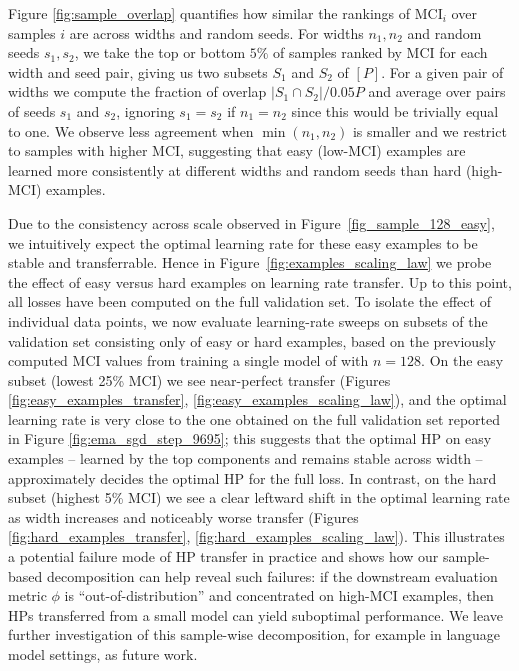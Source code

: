 \documentclass{article} %
\newcommand{\MCI}{\mathrm{MCI}}
\begin{document}
Figure \ref{fig:sample_overlap} quantifies how similar the rankings of $\MCI_i$ over samples $i$ are across widths and random seeds. For widths $n_1, n_2$ and random seeds $s_1, s_2$, we take the top or bottom $5\%$ of samples ranked by MCI for each width and seed pair, giving us two subsets $S_1$ and $S_2$ of $[P]$. For a given pair of widths we compute the fraction of overlap $|S_1 \cap S_2| / 0.05P$ and average over pairs of seeds $s_1$ and $s_2$, ignoring $s_1 = s_2$ if $n_1 = n_2$ since this would be trivially equal to one. We observe less agreement when $\min(n_1, n_2)$ is smaller and we restrict to samples with higher MCI, suggesting that easy (low-MCI) examples are learned more consistently at different widths and random seeds than hard (high-MCI) examples. 


Due to the consistency across scale observed in Figure~\ref{fig_sample_128_easy}, we intuitively expect the optimal learning rate for these easy examples to be stable and transferrable. 
Hence in Figure~\ref{fig:examples_scaling_law} we probe the effect of easy versus hard examples on learning rate transfer. Up to this point, all losses have been computed on the full validation set. To isolate the effect of individual data points, we now evaluate learning-rate sweeps on subsets of the validation set consisting only of easy or hard examples, based on the previously computed MCI values from training a single model of with $n = 128$. 
On the easy subset (lowest 25\% MCI) we see near-perfect transfer (Figures \ref{fig:easy_examples_transfer}, \ref{fig:easy_examples_scaling_law}), and the optimal learning rate is very close to the one obtained on the full validation set reported in Figure \ref{fig:ema_sgd_step_9695}; this suggests that the optimal HP on easy examples -- learned by the top components and remains stable across width -- approximately decides the optimal HP for the full loss. 
In contrast, on the hard subset (highest 5\% MCI) we see a clear leftward shift in the optimal learning rate as width increases and noticeably worse transfer (Figures \ref{fig:hard_examples_transfer}, \ref{fig:hard_examples_scaling_law}). 
This illustrates a potential failure mode of HP transfer in practice and shows how our sample-based decomposition can help reveal such failures: if the downstream evaluation metric $\phi$ is ``out-of-distribution'' and concentrated on high-MCI examples, then HPs transferred from a small model can yield suboptimal performance. We leave further investigation of this sample-wise decomposition, for example in language model settings, as future work. 
\end{document}
